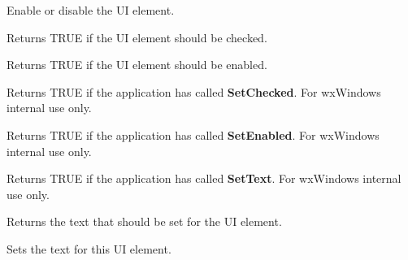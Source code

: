 
Enable or disable the UI element.

\label{wxupdateuieventgetchecked}


Returns TRUE if the UI element should be checked.

\label{wxupdateuieventgetenabled}


Returns TRUE if the UI element should be enabled.

\label{wxupdateuieventgetsetchecked}


Returns TRUE if the application has called {\bf SetChecked}. For wxWindows internal use only.

\label{wxupdateuieventgetsetenabled}


Returns TRUE if the application has called {\bf SetEnabled}. For wxWindows internal use only.

\label{wxupdateuieventgetsettext}


Returns TRUE if the application has called {\bf SetText}. For wxWindows internal use only.

\label{wxupdateuieventgettext}


Returns the text that should be set for the UI element.

\label{wxupdateuieventsettext}


Sets the text for this UI element.

